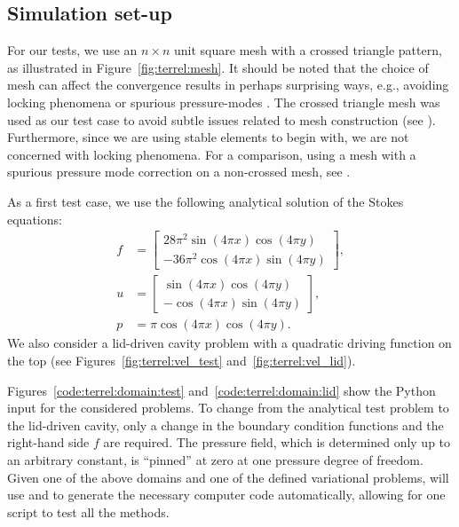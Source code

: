 \subsection{Simulation set-up}

For our tests, we use an $n \times n$ unit square
mesh with a crossed triangle pattern, as illustrated in
Figure~\ref{fig:terrel:mesh}. It should be noted that the
choice of mesh can affect the convergence results in perhaps surprising
ways, e.g., avoiding locking phenomena \citep{NagtegaalDeJong1974}
or spurious pressure-modes \citep{Malkus2000}. The crossed
triangle mesh was used as our test case to avoid subtle
issues related to mesh construction (see \citet[Proposition~6.1,
Section~VI.6]{BrezziFortin1991}). Furthermore, since we are using stable
elements to begin with, we are not concerned with locking phenomena. For
a comparison, using a mesh with a spurious pressure mode correction on
a non-crossed mesh, see \citet{TerrelScott2008}.

As a first test case, we use the following analytical solution of the
Stokes equations:
%
\begin{align}
\label{eqn:terrel:testcase}
  f &=
    \begin{bmatrix}
      28\pi^2\sin(4\pi x)\cos(4\pi y)
      \\
      -36\pi^2\cos(4\pi x)\sin(4\pi y)
    \end{bmatrix},
\\
  u &=
  \begin{bmatrix}
    \sin(4\pi x)\cos(4\pi y)
      \\
     -\cos(4\pi x)\sin(4\pi y)
   \end{bmatrix},
\\
  p &= \pi\cos(4\pi x)\cos(4\pi y).
\end{align}
%
We also consider a lid-driven cavity problem with a quadratic
driving function on the top (see Figures~\ref{fig:terrel:vel_test}
and~\ref{fig:terrel:vel_lid}).

Figures~\ref{code:terrel:domain:test} and~\ref{code:terrel:domain:lid}
show the \dolfin{} Python input for the considered problems. To change
from the analytical test problem to the lid-driven cavity, only a
change in the boundary condition functions and the right-hand side
$f$ are required.  The pressure field, which is determined only up to
an arbitrary constant, is ``pinned'' at zero at one pressure degree
of freedom.  Given one of the above domains and one of the defined
variational problems, \dolfin{} will use \ffc{} and \fiat{} to generate
the necessary computer code automatically, allowing for one script to
test all the methods.

